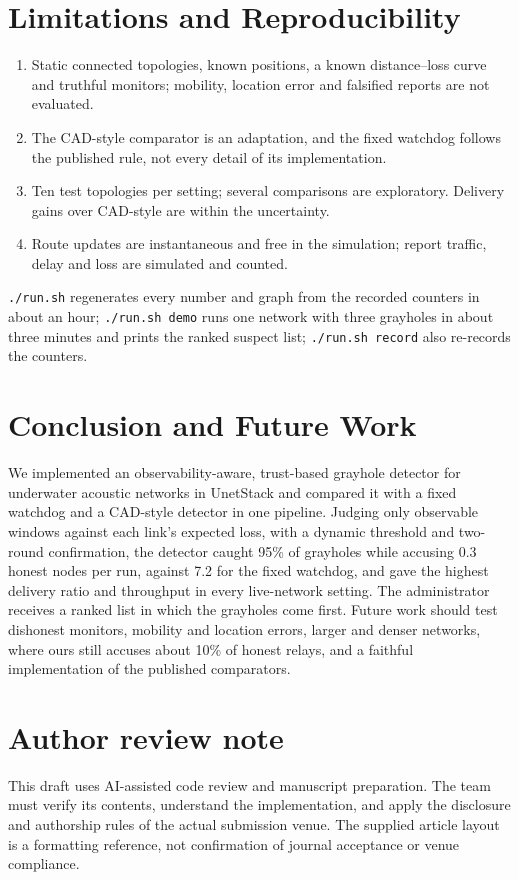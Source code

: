 \documentclass{article}
\begin{document}
\section{Limitations and Reproducibility}\label{sec:limits}
\begin{enumerate}
\item Static connected topologies, known positions, a known distance--loss curve and truthful monitors; mobility, location error and falsified reports are not evaluated.
\item The CAD-style comparator is an adaptation, and the fixed watchdog follows the published rule, not every detail of its implementation.
\item Ten test topologies per setting; several comparisons are exploratory. Delivery gains over CAD-style are within the uncertainty.
\item Route updates are instantaneous and free in the simulation; report traffic, delay and loss are simulated and counted.
\end{enumerate}
\texttt{./run.sh} regenerates every number and graph from the recorded counters in about an hour; \texttt{./run.sh demo} runs one network with three grayholes in about three minutes and prints the ranked suspect list; \texttt{./run.sh record} also re-records the counters.

\section{Conclusion and Future Work}\label{sec:conclusion}
We implemented an observability-aware, trust-based grayhole detector for underwater acoustic networks in UnetStack and compared it with a fixed watchdog and a CAD-style detector in one pipeline. Judging only observable windows against each link's expected loss, with a dynamic threshold and two-round confirmation, the detector caught 95\% of grayholes while accusing 0.3 honest nodes per run, against 7.2 for the fixed watchdog, and gave the highest delivery ratio and throughput in every live-network setting. The administrator receives a ranked list in which the grayholes come first. Future work should test dishonest monitors, mobility and location errors, larger and denser networks, where ours still accuses about 10\% of honest relays, and a faithful implementation of the published comparators.

\section*{Author review note}
This draft uses AI-assisted code review and manuscript preparation. The team must verify its contents, understand the implementation, and apply the disclosure and authorship rules of the actual submission venue. The supplied article layout is a formatting reference, not confirmation of journal acceptance or venue compliance.
\end{document}
